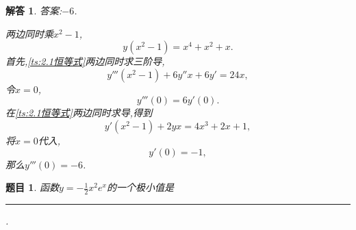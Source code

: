 \documentclass[a4paper,oneside,12pt]{ctexart}
\theoremstyle{plain}
\newtheorem{task}{题目}[section]
\theoremstyle{nonumberplain}
\newtheorem{solution}{解答}
\theoremstyle{nonumberplain}
\theoremstyle{nonumberplain}
\theoremstyle{nonumberbreak}
\newcommand{\blank}{\rule[-4pt]{3cm}{0.5pt}}
\begin{document}
    \begin{solution}
        答案:$-6$.

        两边同时乘$x^2-1$, 
        \begin{equation}
            \label{ts:2.1恒等式}
            y(x^2-1)=x^4+x^2+x.
        \end{equation}
        首先,\cref{ts:2.1恒等式}两边同时求三阶导,
        \begin{equation*}
            y'''(x^2-1)+6y''x+6y'=24x,
        \end{equation*}
        令$x=0$,
        \begin{equation*}
            y'''(0)=6y'(0).
        \end{equation*}
        在\cref{ts:2.1恒等式}两边同时求导,得到 
        \begin{equation*}
            y'(x^2-1)+2yx=4x^3+2x+1,
        \end{equation*}
        将$x=0$代入, 
        \begin{equation*}
            y'(0)=-1,
        \end{equation*}
        那么$y'''(0)=-6$.
    \end{solution}

    \begin{task}
        \label{ts:2.4}
        函数$y=-\frac{1}{2}x^2e^x$的一个极小值是\blank.
    \end{task}
\end{document}
